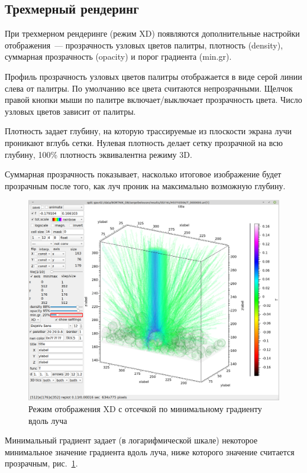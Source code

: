 \documentclass[12pt]{article}
\begin{document}
\subsection{Трехмерный рендеринг}
При трехмерном рендеринге (режим XD) появляются дополнительные настройки отображения~--- прозрачность узловых цветов палитры,
плотность (density), суммарная прозрачность (opacity) и порог градиента (min.gr).

Профиль прозрачность узловых цветов палитры отображается в виде серой линии слева от палитры. По умолчанию все цвета считаются непрозрачными.
Щелчок правой кнопки мыши по палитре включает/выключает прозрачность цвета. Число узловых цветов зависит от палитры.

Плотность задает глубину, на которую трассируемые из плоскости экрана лучи проникают вглубь сетки. Нулевая плотность
делает сетку прозрачной на всю глубину, 100\% плотность эквивалентна режиму 3D.

Суммарная прозрачность показывает, насколько итоговое изображение будет прозрачным после того, как луч проник на максимально возможную глубину.

\begin{figure}[hb]
  \begin{center}
      \includegraphics[width=.7\textwidth]{picts/XD-grad.png} 
  \end{center}
  \caption{Режим отображения XD с отсечкой по минимальному градиенту вдоль луча}\label{XD:grad:pict}
\end{figure}

Минимальный градиент задает (в логарифмической шкале) некоторое минимальное значение градиента вдоль луча, ниже которого значение считается прозрачным, рис.~\ref{XD:grad:pict}.
\end{document}
